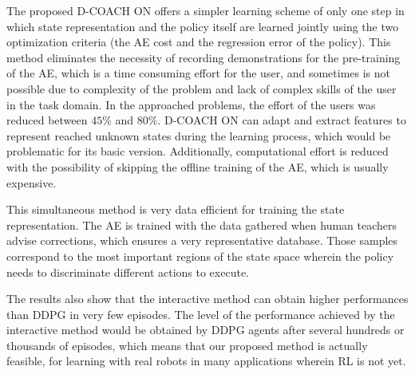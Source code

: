 The proposed D-COACH ON offers a simpler learning scheme of only one step in which state representation and the policy itself are learned jointly using the two optimization criteria (the AE cost and the regression error of the policy). This method eliminates the necessity of recording demonstrations for the pre-training of the AE, which is a time consuming effort for the user, and sometimes is not possible due to complexity of the problem and lack of complex skills of the user in the task domain. In the approached problems, the effort of the users was reduced between $45\%$ and $80\%$. D-COACH ON can adapt and extract features to represent reached unknown states during the learning process, which would be problematic for its basic version. Additionally, computational effort is reduced with the possibility of skipping the offline training of the AE, which is usually expensive. 

This simultaneous method is very data efficient for training the state representation. The AE is trained with the data gathered when human teachers advise corrections, which ensures a very representative database. Those samples correspond to the most important regions of the state space wherein the policy needs to discriminate different actions to execute.

The results also show that the interactive method can obtain higher performances than DDPG in very few episodes. The level of the performance achieved by the interactive method would be obtained by DDPG agents after several hundreds or thousands of episodes, which means that our proposed method is actually feasible, for learning with real robots in many applications wherein RL is not yet.